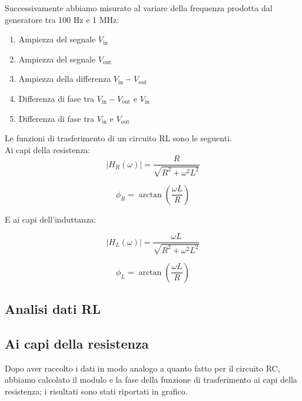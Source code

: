 \documentclass[letterpaper,12pt]{article}
\begin{document}
Successivamente abbiamo misurato al variare della frequenza prodotta dal generatore tra 100 Hz e 1 MHz:
\begin{enumerate}
	\item Ampiezza del segnale $V_\text{in}$
	\item Ampiezza del segnale $V_\text{out}$
	\item Ampiezza della differenza $V_\text{in} - V_\text{out}$
	\item Differenza di fase tra $V_\text{in} - V_\text{out}$ e $V_\text{in}$
	\item Differenza di fase tra $V_\text{in}$ e $V_\text{out}$
\end{enumerate}

Le funzioni di trasferimento di un circuito RL sono le seguenti. \\
Ai capi della resistenza:
\begin{equation}
	\label{eq:Modulo RL (resistenza)}
	|H_R(\omega)| = \frac{R}{\sqrt{R^2 + \omega^2L^2}}
\end{equation}

\begin{equation}
	\label{eq:Fase RL (resistenza)}
	\phi_R = \arctan\left(\frac{\omega L}{R}\right)
\end{equation}

E ai capi dell'induttanza:

\begin{equation}
	\label{eq:Modulo RL (induttanza)}
	|H_L(\omega)| = \frac{\omega L}{\sqrt{R^2 + \omega^2L^2}}
\end{equation}

\begin{equation}
	\label{eq:Fase RL (induttanza)}
	\phi_L = \arctan\left(\frac{\omega L}{R}\right)
\end{equation}


\subsection{Analisi dati RL}

\subsection{Ai capi della resistenza}

Dopo aver raccolto i dati in modo analogo a quanto fatto per il circuito RC, abbiamo calcolato il modulo e la fase della funzione di trasferimento ai capi della resistenza; i risultati sono stati riportati in grafico. \\
\end{document}
